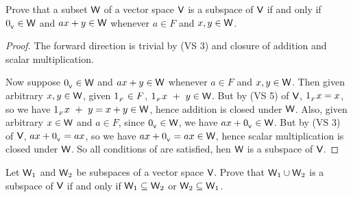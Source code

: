 \begin{exercise} \label{exercise 1.3.18}
Prove that a subset \(\textsf{W}\) of a vector space \(\textsf{V}\) is a subspace of \(\textsf{V}\) if and only if \(0_{_{\textsf{V}}} \in \textsf{W}\) and \(a x + y \in \textsf{W}\) whenever \(a \in F\) and \(x, y \in \textsf{W}\).
\end{exercise}

\begin{proof}
The forward direction is trivial by  (VS 3) and closure of addition and scalar multiplication.

Now suppose \(0_{_{\textsf{V}}} \in \textsf{W}\) and \(a x + y \in \textsf{W}\) whenever \(a \in F\) and \(x, y \in \textsf{W}\).
Then given arbitrary \(x, y \in \textsf{W}\), given \(1_{_F} \in F\), \(1_{_F} x\ +\ y \in \textsf{W}\).
But by (VS 5) of \(\textsf{V}\), \(1_{_F} x = x\), so we have \(1_{_F} x\ +\ y = x + y \in \textsf{W}\), hence addition is closed under \(\textsf{W}\).
Also, given arbitrary \(x \in \textsf{W}\) and \(a \in F\), since \(0_{_{\textsf{V}}} \in \textsf{W}\), we have \(ax + 0_{_{\textsf{V}}} \in \textsf{W}\).
But by (VS 3) of \(\textsf{V}\), \(ax + 0_{_{\textsf{V}}} = ax\), so we have \(ax + 0_{_{\textsf{V}}} = ax \in \textsf{W}\), hence scalar multiplication is closed under \(\textsf{W}\).
So all conditions of  are satisfied, hen \(\textsf{W}\) is a subspace of \(\textsf{V}\).
\end{proof}

\begin{exercise} \label{exercise 1.3.19}
Let \(\textsf{W}_1\) and \(\textsf{W}_2\) be subspaces of a vector space \(\textsf{V}\).
Prove that \(\textsf{W}_1 \cup \textsf{W}_2\) is a subspace of \(\textsf{V}\) if and only if \(\textsf{W}_1 \subseteq \textsf{W}_2\) or \(\textsf{W}_2 \subseteq \textsf{W}_1\).
\end{exercise}

